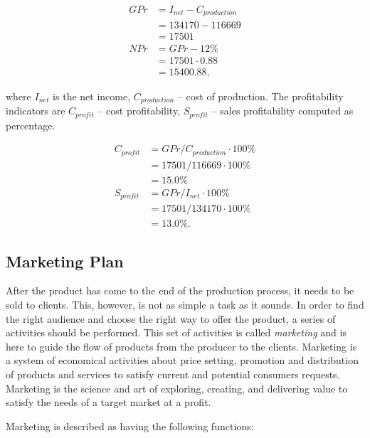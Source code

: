 \begin{equation}
 \begin{split}
GPr &= I_{net} - C_{production}\\
    &= 134170 - 116669\\
    &= 17501 \\
NPr &= GPr - 12\% \\
    &= 17501 \cdot 0.88 \\
    &= 15400.88,
\end{split}
\end{equation}

\noindent where $I_{net}$ is the net income, $C_{production}$ -- cost of
production. The profitability indicators are $C_{profit}$ -- cost
profitability, $S_{profit}$ -- sales profitability computed as percentage.

\begin{equation}
 \begin{split}
  C_{profit} &= GPr / C_{production} \cdot 100\%\\
              &= 17501 / 116669 \cdot 100\% \\
              &= 15.0 \%\\
  S_{profit} &= GPr / I_{net} \cdot 100\% \\
             &= 17501 / 134170 \cdot 100\% \\
             &= 13.0 \%.
 \end{split}
\end{equation}

\subsection{Marketing Plan}

After the product has come to the end of the production process, it needs to
be sold to clients. This, however, is not as simple a task as it sounds. In
order to find the right audience and choose the right way to offer the
product, a series of activities should be performed. This set of activities is
called \emph{marketing} and is here to guide the flow of products from the
producer to the clients. Marketing is a system of economical activities about
price setting, promotion and distribution of products and services to satisfy
current and potential consumers requests. Marketing is the science and art of
exploring, creating, and delivering value to satisfy the needs of a target
market at a profit.

Marketing is described as having the following functions:

